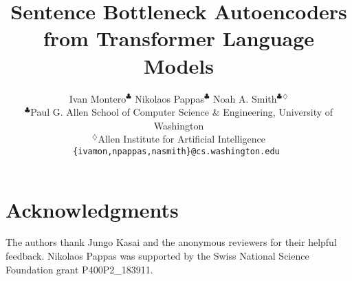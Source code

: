 \documentclass[11pt]{article}
\title{Sentence Bottleneck Autoencoders from Transformer Language Models}
\author{
Ivan Montero$^{\clubsuit}$ \quad
Nikolaos Pappas$^{\clubsuit}$ \quad
Noah A. Smith$^{\clubsuit}$$^{\diamondsuit}$
\vspace{5mm}
\\
$^{\clubsuit}$Paul G. Allen School of Computer Science \& Engineering, University of Washington \\
   $^{\diamondsuit}$Allen Institute for Artificial Intelligence \\
   {\tt \{ivamon,npappas,nasmith\}@cs.washington.edu } 
}
\newcommand{\ivan}[1]{\textcolor{orange}{\bf [Ivan: #1]}}
\newcommand{\nikos}[1]{\textcolor{teal}{\bf [Nikos: #1]}}
\begin{document}
\maketitle








\section*{Acknowledgments}
The authors thank Jungo Kasai 
and the anonymous reviewers for their helpful feedback.
Nikolaos Pappas was supported by the Swiss National Science Foundation grant P400P2\_183911. 





% 
\clearpage
\appendix

\end{document}
